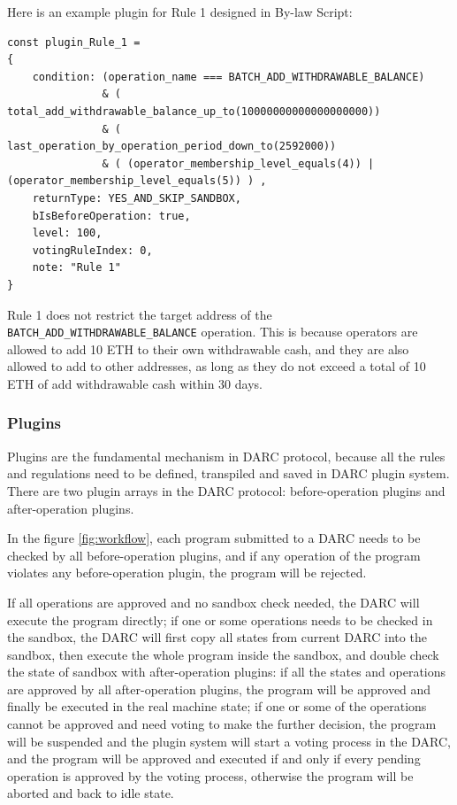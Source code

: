 \documentclass[main.tex]{subfiles}
\begin{document}
Here is an example plugin for Rule 1 designed in By-law Script:

\begin{verbatim}
const plugin_Rule_1 = 
{
    condition: (operation_name === BATCH_ADD_WITHDRAWABLE_BALANCE)
               & ( total_add_withdrawable_balance_up_to(10000000000000000000))
               & ( last_operation_by_operation_period_down_to(2592000)) 
               & ( (operator_membership_level_equals(4)) | (operator_membership_level_equals(5)) ) ,
    returnType: YES_AND_SKIP_SANDBOX,
    bIsBeforeOperation: true,
    level: 100,
    votingRuleIndex: 0,
    note: "Rule 1"
}
\end{verbatim}

Rule 1 does not restrict the target address of the \texttt{BATCH\_ADD\_WITHDRAWABLE\_BALANCE} operation. This is because operators are allowed to add 10 ETH to their own withdrawable cash, and they are also allowed to add to other addresses, as long as they do not exceed a total of 10 ETH of add withdrawable cash within 30 days.

\subsubsection{Plugins}

Plugins are the fundamental mechanism in DARC protocol, because all the rules and regulations need to be defined, transpiled and saved in DARC plugin system. There are two plugin arrays in the DARC protocol: before-operation plugins and after-operation plugins.


In the figure \ref{fig:workflow}, each program submitted to a DARC needs to be checked by all before-operation plugins, and if any operation of the program violates any before-operation plugin, the program will be rejected. 

If all operations are approved and no sandbox check needed, the DARC will execute the program directly; if one or some operations needs to be checked in the sandbox, the DARC will first copy all states from current DARC into the sandbox, then execute the whole program inside the sandbox, and double check the state of sandbox with after-operation plugins: if all the states and operations are approved by all after-operation plugins, the program will be approved and finally be executed in the real machine state; if one or some of the operations cannot be approved and need voting to make the further decision, the program will be suspended and the plugin system will start a voting process in the DARC, and the program will be approved and executed if and only if every pending operation is approved by the voting process, otherwise the program will be aborted and back to idle state.
\end{document}
